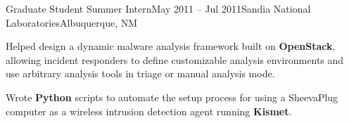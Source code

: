 
\def\PositionTitle{Graduate Student Summer Intern}
\def\PositionPeriod{May 2011 -- Jul 2011} %
\def\OrgName{Sandia National Laboratories}
\def\OrgLocation{Albuquerque, NM}


\begin{rExperience}{\PositionTitle}{\PositionPeriod}{\OrgName}{\OrgLocation}

  \item Helped design a dynamic malware analysis framework built on \textbf{OpenStack}, allowing incident responders to define customizable analysis environments and use arbitrary analysis tools in triage or manual analysis mode.

  \item Wrote \textbf{Python} scripts to automate the setup process for using a SheevaPlug computer as a wireless intrusion detection agent running \textbf{Kismet}.

\end{rExperience}
